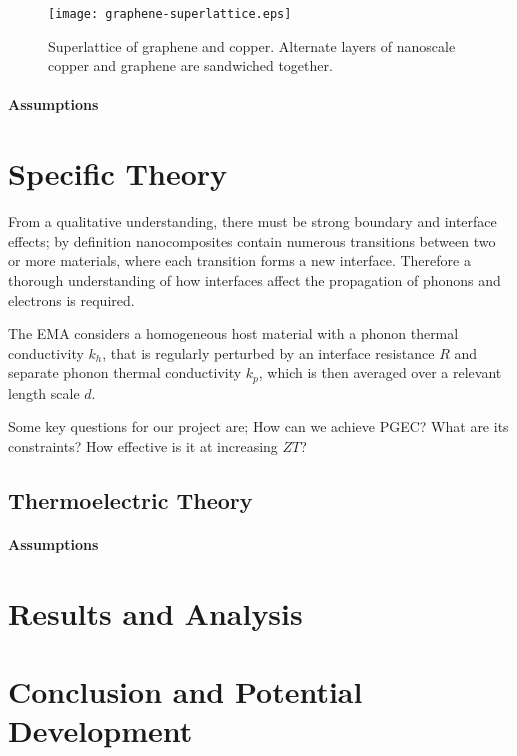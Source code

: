 \documentclass[12pt,draft]{article}
\begin{document}
\begin{figure}
	\centering
	\texttt{[image: graphene-superlattice.eps]}
	\caption{Superlattice of graphene and copper. Alternate layers of nanoscale copper and graphene are sandwiched together.}
	\label{fig:superlattice}
\end{figure}

\paragraph{Assumptions}

\section{Specific Theory}
From a qualitative understanding, there must be strong boundary and interface effects; by definition nanocomposites contain numerous transitions between two or more materials, where each transition forms a new interface. Therefore a thorough understanding of how interfaces affect the propagation of phonons and electrons is required.

The EMA considers a homogeneous host material with a phonon thermal conductivity $k_h$, that is regularly perturbed by an interface resistance $R$ and separate phonon thermal conductivity $k_p$, which is then averaged over a relevant length scale $d$.

Some key questions for our project are; How can we achieve \ac{PGEC}? What are its constraints? How effective is it at increasing $ZT$?


\subsection{Thermoelectric Theory}
\paragraph{Assumptions}

\section{Results and Analysis}

\section{Conclusion and Potential Development}
\end{document}
